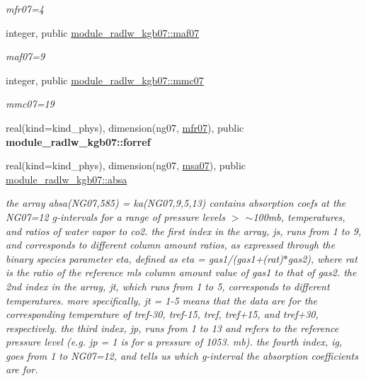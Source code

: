 \begin{DoxyCompactItemize}
\begin{DoxyCompactList}\small\item\em mfr07=4 \end{DoxyCompactList}\item 
\mbox{\label{group__module__radlw__kgbnn_ga21ac454fe21fb07ee555b4106121b2ae}} 
integer, public \hyperlink{group__module__radlw__kgbnn_ga21ac454fe21fb07ee555b4106121b2ae}{module\+\_\+radlw\+\_\+kgb07\+::maf07}
\begin{DoxyCompactList}\small\item\em maf07=9 \end{DoxyCompactList}\item 
\mbox{\label{group__module__radlw__kgbnn_ga2d176bec938d9fdcc2369fda91308702}} 
integer, public \hyperlink{group__module__radlw__kgbnn_ga2d176bec938d9fdcc2369fda91308702}{module\+\_\+radlw\+\_\+kgb07\+::mmc07}
\begin{DoxyCompactList}\small\item\em mmc07=19 \end{DoxyCompactList}\item 
\mbox{\label{group__module__radlw__kgbnn_ga43ceef4cb2707a2874c2d59e93ba9791}} 
real(kind=kind\+\_\+phys), dimension(ng07, \hyperlink{group__module__radlw__kgbnn_ga0bd5d550553238ae13cbf57423d102c8}{mfr07}), public {\bfseries module\+\_\+radlw\+\_\+kgb07\+::forref}
\item 
\mbox{\label{group__module__radlw__kgbnn_gaf106cf054f7496a092ceb0c399753a36}} 
real(kind=kind\+\_\+phys), dimension(ng07, \hyperlink{namespacemodule__radlw__kgb07_a0acb84a6b261fc00f1765707844c32f2}{msa07}), public \hyperlink{group__module__radlw__kgbnn_gaf106cf054f7496a092ceb0c399753a36}{module\+\_\+radlw\+\_\+kgb07\+::absa}
\begin{DoxyCompactList}\small\item\em the array absa(\+N\+G07,585) = ka(\+N\+G07,9,5,13) contains absorption coefs at the N\+G07=12 g-\/intervals for a range of pressure levels $>$ $\sim$100mb, temperatures, and ratios of water vapor to co2. the first index in the array, js, runs from 1 to 9, and corresponds to different column amount ratios, as expressed through the binary species parameter eta, defined as eta = gas1/(gas1+(rat)$\ast$gas2), where rat is the ratio of the reference mls column amount value of gas1 to that of gas2. the 2nd index in the array, jt, which runs from 1 to 5, corresponds to different temperatures. more specifically, jt = 1-\/5 means that the data are for the corresponding temperature of tref-\/30, tref-\/15, tref, tref+15, and tref+30, respectively. the third index, jp, runs from 1 to 13 and refers to the reference pressure level (e.\+g. jp = 1 is for a pressure of 1053. mb). the fourth index, ig, goes from 1 to N\+G07=12, and tells us which g-\/interval the absorption coefficients are for. \end{DoxyCompactList}\item 

\end{DoxyCompactItemize}
